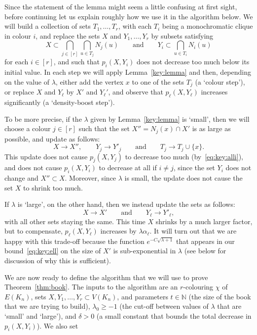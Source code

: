 \documentclass[12pt,reqno]{amsart}
\theoremstyle{definition}
\theoremstyle{remark}
\newcommand\N{\mathbb{N}}
\renewcommand{\ge}{\geqslant}
\renewcommand{\to}{\rightarrow}
\def\N{\mathbb{N}}
\begin{document}
Since the statement of the lemma might seem a little confusing at first sight, before continuing let us explain roughly how we use it in the algorithm below. We will build a collection of sets \(T_1,\ldots,T_r\), with each \(T_i\) being a monochromatic clique in colour \(i\), and replace the sets \(X\) and \(Y_1,\ldots,Y_r\) by subsets satisfying
%
\begin{equation*}
	X \subset \bigcap_{j \in [r]} \bigcap_{u \in T_j} N_j(u) \qquad \text{and} \qquad Y_i \subset \bigcap_{u \in T_i} N_i(u)
\end{equation*}
%
for each \(i \in [r]\), and such that \(p_i(X,Y_i)\) does not decrease too much below its initial value. In each step we will apply Lemma~\ref{key:lemma} and then, depending on the value of \(\lambda\), either add the vertex \(x\) to one of the sets \(T_j\) (a `colour step'), or replace \(X\) and \(Y_\ell\) by \(X'\) and \(Y_\ell'\), and observe that \(p_\ell(X,Y_\ell)\) increases significantly (a `density-boost step').

To be more precise, if the \(\lambda\) given by Lemma~\ref{key:lemma} is `small', then we will choose a colour \(j \in [r]\) such that the set \(X'' = N_j(x) \cap X'\) is as large as possible, and update as follows:
%
\begin{equation*}
	X \to X'', \qquad Y_j \to Y'_j \qquad \text{and} \qquad T_j \to T_j \cup \{x\}.
\end{equation*}
%
This update does not cause \(p_j(X,Y_j)\) to decrease too much (by~\eqref{eq:key:alli}), and does not cause \(p_i(X,Y_i)\) to decrease at all if \(i \ne j\), since the set \(Y_i\) does not change and \(X'' \subset X\). Moreover, since \(\lambda\) is small, the update does not cause the set \(X\) to shrink too much.

If \(\lambda\) is `large', on the other hand, then we instead update the sets as follows:
%
\begin{equation*}
	X \to X' \qquad \text{and} \qquad Y_\ell \to Y'_\ell,
\end{equation*}
%
with all other sets staying the same. This time \(X\) shrinks by a much larger factor, but to compensate, \(p_\ell(X,Y_\ell)\) increases by \(\lambda \alpha_\ell\). It will turn out that we are happy with this trade-off because the function \(e^{- C \sqrt{\lambda + 1}}\) that appears in our bound~\eqref{eq:key:ell} on the size of \(X'\) is sub-exponential in \(\lambda\) (see below for discussion of why this is sufficient).

We are now ready to define the algorithm that we will use to prove Theorem~\ref{thm:book}. The inputs to the algorithm are an \(r\)-colouring \(\chi\) of \(E(K_n)\),
sets \(X,Y_1,\ldots, Y_r \subset V(K_n)\), and parameters \(t \in \N\) (the size of the book that we are trying to build), \(\lambda_0 \ge -1\) (the cut-off between values of \(\lambda\) that are `small' and `large'), and \(\delta > 0\) (a small constant that bounds the total decrease in \(p_i(X,Y_i)\)). We also set
\end{document}
